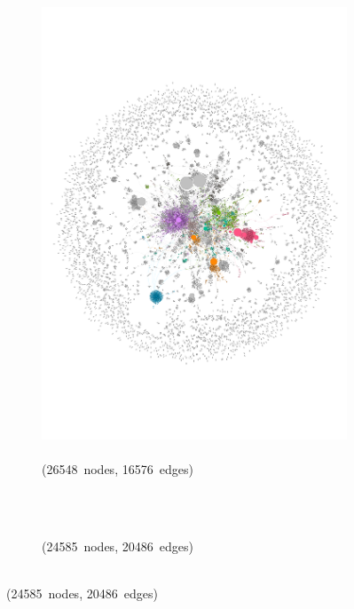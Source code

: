 \documentclass[
  a4paper,
  abstract=on,
  captions=tableabove
  ]{scrartcl}
\begin{document}
\begin{figure}
\begin{subfigure}{.45\linewidth}
        \end{subfigure}
        \begin{subfigure}{.45\linewidth}
          \caption{\\ (\num{26548}~nodes, \num{16576}~edges)}
          \label{subfig:net_last_cases_hyperlocal}
          \includegraphics[width=\linewidth, height=\textheight, keepaspectratio]{img/net_hyperlocal_four.pdf}
        \end{subfigure}\\
        \begin{subfigure}{.45\linewidth}
          \caption{\\ (\num{24585}~nodes, \num{20486}~edges)}
          \label{subfig:net_last_cases_solopreneur}

\end{subfigure}
\end{figure}
\end{document}
